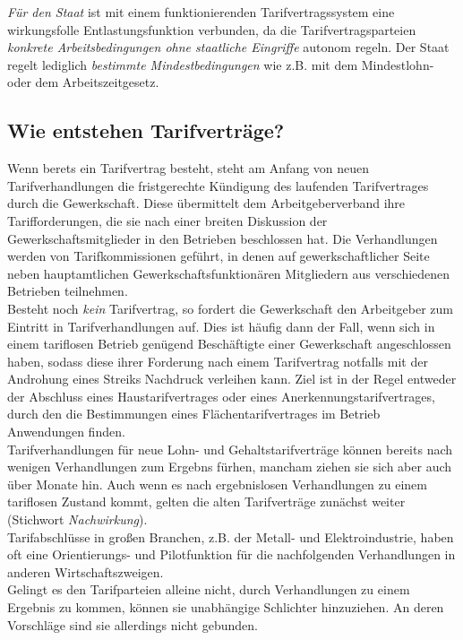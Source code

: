 \documentclass[a4paper, 12pt]{report}
\begin{document}
\emph{Für den Staat} ist mit einem funktionierenden Tarifvertragssystem eine
wirkungsfolle Entlastungsfunktion verbunden, da die Tarifvertragsparteien
\emph{konkrete Arbeitsbedingungen ohne staatliche Eingriffe} autonom regeln.
Der Staat regelt lediglich \emph{bestimmte Mindestbedingungen} wie z.B.
mit dem Mindestlohn- oder dem Arbeitszeitgesetz.

\subsection{Wie entstehen Tarifverträge?}

Wenn berets ein Tarifvertrag besteht, steht am Anfang von neuen
Tarifverhandlungen die fristgerechte Kündigung des laufenden Tarifvertrages
durch die Gewerkschaft. Diese übermittelt dem Arbeitgeberverband ihre
Tarifforderungen, die sie nach einer breiten Diskussion der
Gewerkschaftsmitglieder in den Betrieben beschlossen hat. Die Verhandlungen
werden von Tarifkommissionen geführt, in denen auf gewerkschaftlicher Seite
neben hauptamtlichen Gewerkschaftsfunktionären Mitgliedern aus verschiedenen
Betrieben teilnehmen. \\

Besteht noch \emph{kein} Tarifvertrag, so fordert die Gewerkschaft den
Arbeitgeber zum Eintritt in Tarifverhandlungen auf. Dies ist häufig dann der
Fall, wenn sich in einem tariflosen Betrieb genügend Beschäftigte einer
Gewerkschaft angeschlossen haben, sodass diese ihrer Forderung nach einem
Tarifvertrag notfalls mit der Androhung eines Streiks Nachdruck verleihen kann.
Ziel ist in der Regel entweder der Abschluss eines Haustarifvertrages oder eines
Anerkennungstarifvertrages, durch den die Bestimmungen eines
Flächentarifvertrages im Betrieb Anwendungen finden. \\

Tarifverhandlungen für neue Lohn- und Gehaltstarifverträge können bereits nach
wenigen Verhandlungen zum Ergebns fürhen, mancham ziehen sie sich aber auch über
Monate hin. Auch wenn es nach ergebnislosen Verhandlungen zu einem
\glqq tariflosen \grqq{} Zustand kommt, gelten die alten Tarifverträge zunächst
weiter (Stichwort \emph{Nachwirkung}). \\

Tarifabschlüsse in großen Branchen, z.B. der Metall- und Elektroindustrie, haben
oft eine Orientierungs- und Pilotfunktion für die nachfolgenden Verhandlungen in
anderen Wirtschaftszweigen. \\

Gelingt es den Tarifparteien alleine nicht, durch Verhandlungen zu einem
Ergebnis zu kommen, können sie unabhängige Schlichter hinzuziehen. An deren
Vorschläge sind sie allerdings nicht gebunden. \\
\end{document}
